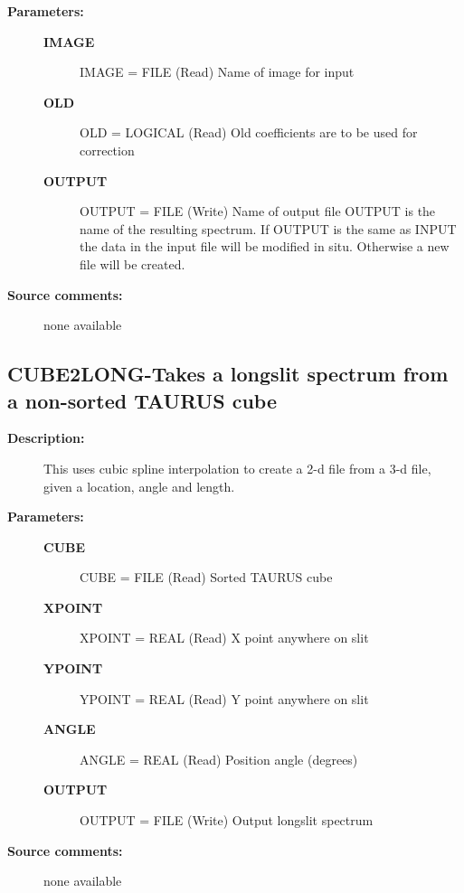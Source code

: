 \begin{description}
\begin{description}
\item [\textbf{Parameters:}]
\begin{description}
\item [\textbf{IMAGE}]
    IMAGE = FILE (Read)
        Name of image for input
\item [\textbf{OLD}]
    OLD = LOGICAL (Read)
        Old coefficients are to be used for correction
\item [\textbf{OUTPUT}]
    OUTPUT = FILE (Write)
        Name of output file
            OUTPUT is the name of the resulting spectrum. If OUTPUT is the
            same as INPUT the data in the input file will be modified in
            situ. Otherwise a new file will be created.
\end{description}

\item [\textbf{Source comments:}]
\begin{terminalv}
  none available

\end{terminalv}
\end{description}
\subsection{CUBE2LONG-\label{CUBE2LONG}Takes a longslit spectrum from a non-sorted TAURUS cube}
\begin{description}

\item [\textbf{Description:}]
   This uses cubic spline interpolation to create a 2-d file from a 3-d
   file, given a location, angle and length.

\item [\textbf{Parameters:}]
\begin{description}
\item [\textbf{CUBE}]
  CUBE = FILE (Read)
        Sorted TAURUS cube
\item [\textbf{XPOINT}]
  XPOINT = REAL (Read)
        X point anywhere on slit
\item [\textbf{YPOINT}]
  YPOINT = REAL (Read)
        Y point anywhere on slit
\item [\textbf{ANGLE}]
  ANGLE = REAL (Read)
        Position angle (degrees)
\item [\textbf{OUTPUT}]
  OUTPUT = FILE (Write)
        Output longslit spectrum
\end{description}

\item [\textbf{Source comments:}]
\begin{terminalv}
  none available


\end{terminalv}
\end{description}
\end{description}
